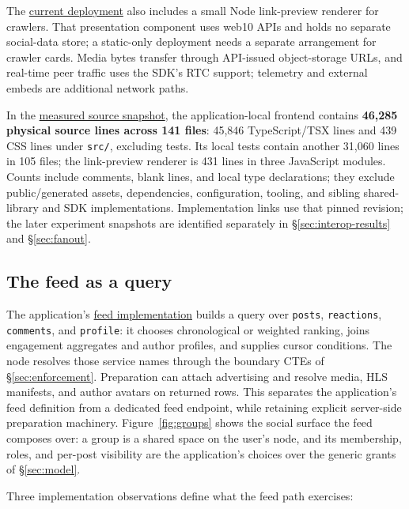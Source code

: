 \documentclass[sigconf, nonacm]{acmart}
\newcommand{\artifactbase}{https://github.com/jacoby149/web10}
\newcommand{\artifactrev}{317fa349eae714ddde07f249ca65cdaa34b6459b}
\newcommand{\artifactdir}[2]{\href{\artifactbase/tree/\artifactrev/#1}{#2}}
\newcommand{\artifactfile}[2]{\href{\artifactbase/blob/\artifactrev/#1}{#2}}
\begin{document}
The \artifactfile{marketing/web10-social/Dockerfile}{current deployment} also
includes a small Node link-preview renderer for crawlers. That presentation
component uses web10 APIs and holds no separate social-data store; a
static-only deployment needs a separate arrangement for crawler cards. Media
bytes transfer through API-issued object-storage URLs, and real-time peer
traffic uses the SDK's RTC support; telemetry and external embeds are
additional network paths.

In the \artifactdir{marketing/web10-social/src}{measured source snapshot},
the application-local frontend contains \textbf{46,285 physical source lines
across 141 files}: 45,846 TypeScript/TSX lines and 439 CSS lines under
\texttt{src/}, excluding tests. Its local tests contain another 31,060 lines
in 105 files; the link-preview renderer is 431 lines in three JavaScript
modules. Counts include comments, blank lines, and local type declarations;
they exclude public/generated assets, dependencies, configuration, tooling,
and sibling shared-library and SDK implementations. Implementation links use
that pinned revision; the later experiment snapshots are identified
separately in \S\ref{sec:interop-results} and \S\ref{sec:fanout}.

\subsection{The feed as a query}

The application's
\artifactfile{marketing/web10-social/src/data/feed.ts}{feed implementation}
builds a query over \texttt{posts}, \texttt{reactions}, \texttt{comments},
and \texttt{profile}: it chooses chronological or weighted ranking, joins
engagement aggregates and author profiles, and supplies cursor conditions.
The node resolves those service names through the boundary CTEs of
\S\ref{sec:enforcement}. Preparation can attach advertising and resolve
media, HLS manifests, and author avatars on returned rows. This separates
the application's feed definition from a dedicated feed endpoint, while
retaining explicit server-side preparation machinery. Figure~\ref{fig:groups}
shows the social surface the feed composes over: a group is a shared space on
the user's node, and its membership, roles, and per-post visibility are the
application's choices over the generic grants of \S\ref{sec:model}.

Three implementation observations define what the feed path exercises:
\end{document}
